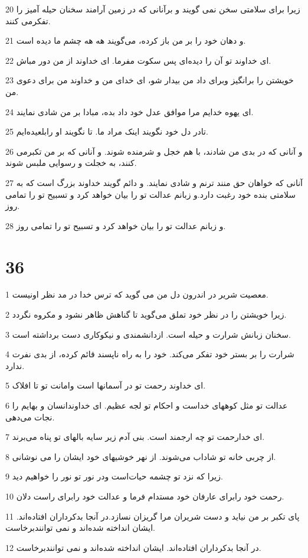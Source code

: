 \par 20 زیرا برای سلامتی سخن نمی گویند و برآنانی که در زمین آرامند سخنان حیله آمیز را تفکرمی کنند.
\par 21 و دهان خود را بر من باز کرده، می‌گویند هه هه چشم ما دیده است.
\par 22 ‌ای خداوند تو آن را دیده‌ای پس سکوت مفرما. ای خداوند از من دور مباش.
\par 23 خویشتن را برانگیز وبرای داد من بیدار شو، ای خدای من و خداوند من برای دعوی من.
\par 24 ‌ای یهوه خدایم مرا موافق عدل خود داد بده، مبادا بر من شادی نمایند.
\par 25 تادر دل خود نگویند اینک مراد ما. تا نگویند او رابلعیده‌ایم.
\par 26 و آنانی که در بدی من شادند، با هم خجل و شرمنده شوند. و آنانی که بر من تکبرمی کنند، به خجلت و رسوایی ملبس شوند.
\par 27 آنانی که خواهان حق منند ترنم و شادی نمایند. و دائم گویند خداوند بزرگ است که به سلامتی بنده خود رغبت دارد.و زبانم عدالت تو را بیان خواهد کرد و تسبیح تو را تمامی روز.
\par 28 و زبانم عدالت تو را بیان خواهد کرد و تسبیح تو را تمامی روز.
 
\chapter{36}

\par 1 معصیت شریر در اندرون دل من می گوید که ترس خدا در مد نظر اونیست.
\par 2 زیرا خویشتن را در نظر خود تملق می‌گوید تا گناهش ظاهر نشود و مکروه نگردد.
\par 3 سخنان زبانش شرارت و حیله است. ازدانشمندی و نیکوکاری دست برداشته است.
\par 4 شرارت را بر بستر خود تفکر می‌کند. خود را به راه ناپسند قائم کرده، از بدی نفرت ندارد.
\par 5 ‌ای خداوند رحمت تو در آسمانها است وامانت تو تا افلاک.
\par 6 عدالت تو مثل کوههای خداست و احکام تو لجه عظیم. ای خداوندانسان و بهایم را نجات می‌دهی.
\par 7 ‌ای خدارحمت تو چه ارجمند است. بنی آدم زیر سایه بالهای تو پناه می‌برند.
\par 8 از چربی خانه تو شاداب می‌شوند. از نهر خوشیهای خود ایشان را می نوشانی.
\par 9 زیرا که نزد تو چشمه حیات‌است ودر نور تو نور را خواهیم دید.
\par 10 رحمت خود رابرای عارفان خود مستدام فرما و عدالت خود رابرای راست دلان.
\par 11 پای تکبر بر من نیاید و دست شریران مرا گریزان نسازد.در آنجا بدکرداران افتاده‌اند. ایشان انداخته شده‌اند و نمی توانندبرخاست.
\par 12 در آنجا بدکرداران افتاده‌اند. ایشان انداخته شده‌اند و نمی توانندبرخاست.
 
